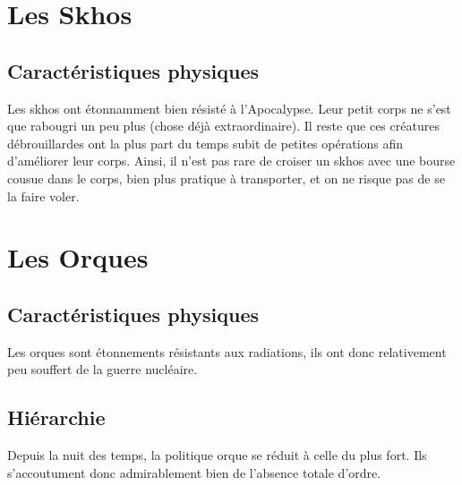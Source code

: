 \section{Les Skhos}
\subsection{Caractéristiques physiques}
Les skhos ont étonnamment bien résisté à l'Apocalypse. Leur petit corps ne s'est que rabougri un peu plus (chose déjà extraordinaire). Il reste que ces créatures débrouillardes ont la plus part du temps subit de petites opérations afin d'améliorer leur corps. Ainsi, il n'est pas rare de croiser un skhos avec une bourse cousue dans le corps, bien plus pratique à transporter, et on ne risque pas de se la faire voler. 
\section{Les Orques}
\subsection{Caractéristiques physiques}
Les orques sont étonnements résistants aux radiations, ils ont donc relativement peu souffert de la guerre nucléaire.
\subsection{Hiérarchie}
Depuis la  nuit des temps, la politique orque se réduit à celle du plus fort. Ils s'accoutument donc admirablement bien de l'absence totale d'ordre.
